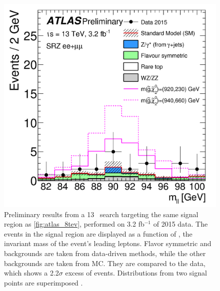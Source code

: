 \begin{centering}
\begin{figure}[!hbt]
\myfloatalign
\includegraphics[width=.9\linewidth]{figures/theory/fig_05.png}
\caption{ Preliminary results from a 13 \tev~search targeting the same signal region as \autoref{fig:atlas_8tev}, performed on 3.2 fb$^{-1}$ of 2015 data. The events in the signal region are displayed as a function of \mll, the invariant mass of the event's leading leptons. Flavor symmetric and \dyjets backgrounds are taken from data-driven methods, while the other backgrounds are taken from \ac{MC}. They are compared to the data, which shows a 2.2$\sigma$ excess of events. Distributions from two signal points are superimposed \cite{ATLAS-CONF-2015-082}.}
\label{fig:atlas_eoye}
\end{figure}
\end{centering}






